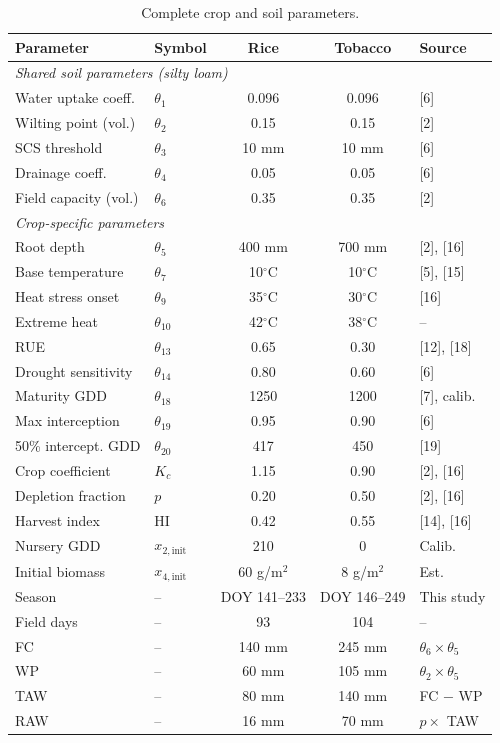\documentclass[12pt, a4paper]{article}
\begin{document}
\begin{table}[H]
\centering
\caption{Complete crop and soil parameters.}
\label{tab:params}
\small
\begin{tabular}{llccl}
\toprule
\textbf{Parameter} & \textbf{Symbol} & \textbf{Rice} & \textbf{Tobacco} & \textbf{Source} \\
\midrule
\multicolumn{5}{l}{\emph{Shared soil parameters (silty loam)}} \\
Water uptake coeff. & $\theta_1$ & 0.096 & 0.096 & [6] \\
Wilting point (vol.) & $\theta_2$ & 0.15 & 0.15 & [2] \\
SCS threshold & $\theta_3$ & 10 mm & 10 mm & [6] \\
Drainage coeff. & $\theta_4$ & 0.05 & 0.05 & [6] \\
Field capacity (vol.) & $\theta_6$ & 0.35 & 0.35 & [2] \\
\midrule
\multicolumn{5}{l}{\emph{Crop-specific parameters}} \\
Root depth & $\theta_5$ & 400 mm & 700 mm & [2], [16] \\
Base temperature & $\theta_7$ & 10$^{\circ}$C & 10$^{\circ}$C & [5], [15] \\
Heat stress onset & $\theta_9$ & 35$^{\circ}$C & 30$^{\circ}$C & [16] \\
Extreme heat & $\theta_{10}$ & 42$^{\circ}$C & 38$^{\circ}$C & -- \\
RUE & $\theta_{13}$ & 0.65 & 0.30 & [12], [18] \\
Drought sensitivity & $\theta_{14}$ & 0.80 & 0.60 & [6] \\
Maturity GDD & $\theta_{18}$ & 1250 & 1200 & [7], calib. \\
Max interception & $\theta_{19}$ & 0.95 & 0.90 & [6] \\
50\% intercept. GDD & $\theta_{20}$ & 417 & 450 & [19] \\
Crop coefficient & $K_c$ & 1.15 & 0.90 & [2], [16] \\
Depletion fraction & $p$ & 0.20 & 0.50 & [2], [16] \\
Harvest index & HI & 0.42 & 0.55 & [14], [16] \\
Nursery GDD & $x_{2,\text{init}}$ & 210 & 0 & Calib. \\
Initial biomass & $x_{4,\text{init}}$ & 60 g/m$^2$ & 8 g/m$^2$ & Est. \\
Season & -- & DOY 141--233 & DOY 146--249 & This study \\
Field days & -- & 93 & 104 & -- \\
FC & -- & 140 mm & 245 mm & $\theta_6 \times \theta_5$ \\
WP & -- & 60 mm & 105 mm & $\theta_2 \times \theta_5$ \\
TAW & -- & 80 mm & 140 mm & FC $-$ WP \\
RAW & -- & 16 mm & 70 mm & $p \times$ TAW \\
\bottomrule
\end{tabular}
\end{table}
\end{document}
